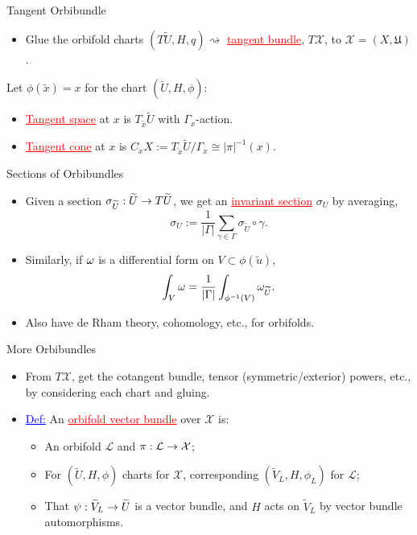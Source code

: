 \begin{frame}{Tangent Orbibundle}
    \begin{itemize}
        \item Glue the orbifold charts $(T\widetilde{U}, H, q) \rightsquigarrow$ \textcolor{red}{\underline{tangent bundle}}, $T\mathcal{X}$, to $\mathcal{X} = (X, \mathfrak{U})$.
    \end{itemize}
    Let $\phi(\tilde{x}) = x$ for the chart $(\widetilde{U}, H, \phi)$:
    \begin{itemize}
        \item \textcolor{red}{\underline{Tangent space}} at $x$ is $T_{\tilde{x}}\widetilde{U}$ with $\Gamma_{x}$-action.
        \item \textcolor{red}{\underline{Tangent cone}} at $x$ is $C_{x}X := T_{\tilde{x}}\widetilde{U}/\Gamma_{x} \cong |\pi|^{-1}(x)$.
    \end{itemize}
\end{frame}

\begin{frame}{Sections of Orbibundles}
    \begin{itemize}
        \item Given a section $\sigma_{\widetilde{U}} : \widetilde{U} \rightarrow T\widetilde{U}$, we get an \textcolor{red}{\underline{invariant section}} $\sigma_{U}$ by averaging,
        \[
            \sigma_{U} := \frac{1}{|\Gamma|}\sum_{\gamma \in \Gamma} \sigma_{\widetilde{U}} \circ \gamma.
        \]
        \item Similarly, if $\omega$ is a differential form on $V \subset \phi(\widetilde{u})$,
        \[
            \int_{V} \omega = \frac{1}{|\Gamma|}\int_{\phi^{-1}(V)} \omega_{\widetilde{U}}.
        \]
        \item Also have de Rham theory, cohomology, etc., for orbifolds.
    \end{itemize}
\end{frame}

\begin{frame}{More Orbibundles}
    \begin{itemize}
        \item From $T\mathcal{X}$, get the cotangent bundle, tensor (symmetric/exterior) powers, etc., by considering each chart and gluing.
        \item \textcolor{blue}{\underline{Def:}} An \textcolor{red}{\underline{orbifold vector bundle}} over $\mathcal{X}$ is:
        \begin{itemize}
            \item An orbifold $\mathcal{L}$ and $\pi : \mathcal{L} \rightarrow \mathcal{X}$;
            \item For $(\widetilde{U}, H, \phi)$ charts for $\mathcal{X}$, corresponding $(\widetilde{V}_{L}, H, \phi_{L})$ for $\mathcal{L}$;
            \item That $\psi : \widetilde{V}_{L} \rightarrow \widetilde{U}$ is a vector bundle, and $H$ acts on $\widetilde{V}_{L}$ by vector bundle automorphisms.
        \end{itemize}
    \end{itemize}
\end{frame}


